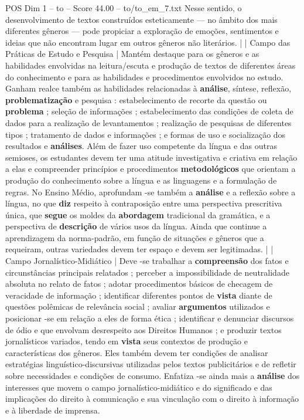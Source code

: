 \begin{textsample}{POS Dim 1 – to – Score 44.00 – to/to\_em\_7.txt}
Nesse sentido, o desenvolvimento de textos construídos esteticamente — no âmbito dos mais diferentes gêneros — pode propiciar a exploração de emoções, sentimentos e ideias que não encontram lugar em outros gêneros não literários. | | Campo das Práticas de Estudo e Pesquisa | Mantém destaque para os gêneros e as habilidades envolvidas na leitura/escuta e produção de textos de diferentes áreas do conhecimento e para as habilidades e procedimentos envolvidos no estudo.
Ganham realce também as habilidades relacionadas à \textbf{análise}, síntese, reflexão, \textbf{problematização} e pesquisa : estabelecimento de recorte da questão ou \textbf{problema} ; seleção de informações ; estabelecimento das condições de coleta de dados para a realização de levantamentos ; realização de pesquisas de diferentes tipos ; tratamento de dados e informações ; e formas de uso e socialização dos resultados e \textbf{análises}.
Além de fazer uso competente da língua e das outras semioses, os estudantes devem ter uma atitude investigativa e criativa em relação a elas e compreender princípios e procedimentos \textbf{metodológicos} que orientam a produção do conhecimento sobre a língua e as linguagens e a formulação de regras.
No Ensino Médio, aprofundam -se também a \textbf{análise} e a reflexão sobre a língua, no que \textbf{diz} respeito à contraposição entre uma perspectiva prescritiva única, que \textbf{segue} os moldes da \textbf{abordagem} tradicional da gramática, e a perspectiva de \textbf{descrição} de vários usos da língua.
Ainda que continue a aprendizagem da norma-padrão, em função de situações e gêneros que a requeiram, outras variedades devem ter espaço e devem ser legitimadas. | | Campo Jornalístico-Midiático | Deve -se trabalhar a \textbf{compreensão} dos fatos e circunstâncias principais relatados ; perceber a impossibilidade de neutralidade absoluta no relato de fatos ; adotar procedimentos básicos de checagem de veracidade de informação ; identificar diferentes pontos de \textbf{vista} diante de questões polêmicas de relevância social ; avaliar \textbf{argumentos} utilizados e posicionar -se em relação a eles de forma ética ; identificar e denunciar discursos de ódio e que envolvam desrespeito aos Direitos Humanos ; e produzir textos jornalísticos variados, tendo em \textbf{vista} seus contextos de produção e características dos gêneros.
Eles também devem ter condições de analisar estratégias linguístico-discursivas utilizadas pelos textos publicitários e de refletir sobre necessidades e condições de consumo.
Enfatiza -se ainda mais a \textbf{análise} dos interesses que movem o campo jornalístico-midiático e do significado e das implicações do direito à comunicação e sua vinculação com o direito à informação e à liberdade de imprensa.

\end{textsample}
